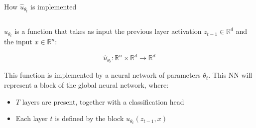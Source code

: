 \documentclass{beamer}
\begin{document}
\begin{frame}{How $\hat u_{\theta_t}$ is implemented}

\begin{columns}[T] %

  \begin{column}{0.5\textwidth}
    $\hat u_{\theta_t}$ is a function that takes as input the previous layer activation $z_{t-1} \in \mathbb{R}^d$ and the input $x \in \mathbb{R}^n$:
    
\[
        \hat u_{\theta_t}: \mathbb{R}^n\times\mathbb{R}^d \rightarrow \mathbb{R}^d
\]    
    
    This function is implemented by a neural network of parameters $\theta_t$. This NN will represent a block of the global neural network, where:
    \begin{itemize}
    \item $T$ layers are present, together with a classification head
      \item Each layer $t$ is defined by the block $\hat u_{\theta_t}(z_{t-1}, x)$
    \end{itemize}
  \end{column}


\end{columns}
\end{frame}
\end{document}
